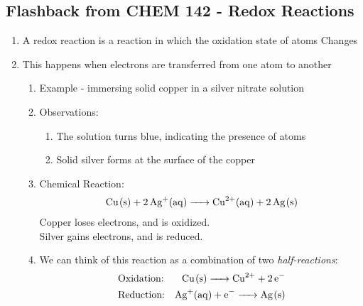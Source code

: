 \documentclass{article}  %
\begin{document}
\subsection*{Flashback from CHEM 142 - Redox Reactions}
\begin{enumerate}
    \item A redox reaction is a reaction in which the oxidation state of atoms Changes
    \item This happens when electrons are transferred from one atom to another
        \begin{enumerate}
            \item Example - immersing solid copper in a silver nitrate solution
            \item Observations:
                \begin{enumerate}
                    \item The solution turns blue, indicating the presence of  atoms
                    \item Solid silver forms at the surface of the copper
                \end{enumerate}
            \item Chemical Reaction:
                \begin{equation*}
                    \begin{aligned}
                        \ce{Cu_(s) + 2 Ag^+_(aq) -> Cu^2+_(aq) + 2 Ag_(s)}
                    \end{aligned}
                \end{equation*}
                Copper loses electrons, and is oxidized. \\
                Silver gains electrons, and is reduced.
            \item We can think of this reaction as a combination of two \emph{half-reactions}:
                \begin{equation*}
                    \begin{aligned}
                        &\text{Oxidation:} &\ce{Cu_(s) -> Cu^2+ + 2e^-} \\
                        &\text{Reduction:} &\ce{Ag^+_(aq) + e^- -> Ag_(s)}
                    \end{aligned}
                \end{equation*}
        \end{enumerate}
\end{enumerate}
\end{document}
